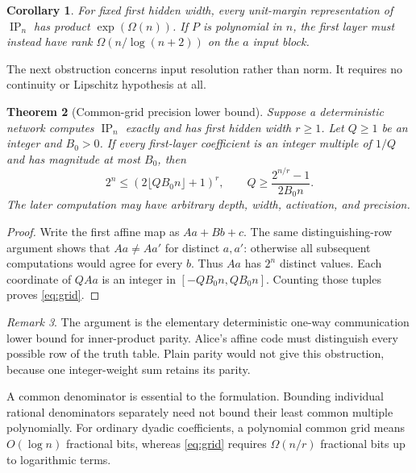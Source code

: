 \documentclass[11pt]{article}
\newtheorem{theorem}{Theorem}[section]
\newtheorem{corollary}[theorem]{Corollary}
\theoremstyle{remark}\newtheorem{remark}[theorem]{Remark}
\newcommand{\IP}{\operatorname{IP}}
\begin{document}
\begin{corollary}
For fixed first hidden width, every unit-margin representation of
$\IP_n$ has product $\exp(\Omega(n))$. If $P$ is polynomial in $n$,
the first layer must instead have rank $\Omega(n/\log(n+2))$ on the
$a$ input block.
\end{corollary}

The next obstruction concerns input resolution rather than norm. It
requires no continuity or Lipschitz hypothesis at all.
\begin{theorem}[Common-grid precision lower bound]\label{thm:grid}
Suppose a deterministic network computes $\IP_n$ exactly and has first
hidden width $r\ge1$. Let $Q\ge1$ be an integer and $B_0>0$. If every
first-layer coefficient is an integer multiple of $1/Q$ and has magnitude
at most $B_0$, then
\begin{equation}\label{eq:grid}
 2^n\le(2\lfloor QB_0n\rfloor+1)^r,
 \qquad
 Q\ge\frac{2^{n/r}-1}{2B_0n}.
\end{equation}
The later computation may have arbitrary depth, width, activation,
and precision.
\end{theorem}
\begin{proof}
Write the first affine map as $Aa+Bb+c$. The same distinguishing-row
argument shows that $Aa\ne Aa'$ for distinct $a,a'$: otherwise all
subsequent computations would agree for every $b$. Thus $Aa$ has $2^n$
distinct values. Each coordinate of $QAa$ is an integer in
$[-QB_0n,QB_0n]$. Counting those tuples proves \eqref{eq:grid}.
\end{proof}

\begin{remark}
The argument is the elementary deterministic one-way communication
lower bound for inner-product parity. Alice's affine code must distinguish
every possible row of the truth table. Plain parity would not give this
obstruction, because one integer-weight sum retains its parity.

A common denominator is essential to the formulation. Bounding individual
rational denominators separately need not bound their least common multiple
polynomially. For ordinary dyadic coefficients, a polynomial common grid
means $O(\log n)$ fractional bits, whereas \eqref{eq:grid} requires
$\Omega(n/r)$ fractional bits up to logarithmic terms.
\end{remark}
\end{document}
